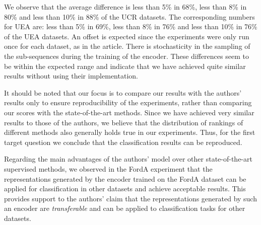 We observe that the average difference is less than 5\% in 68\%, less than 8\% in 80\% and less than 10\% in 88\% of the UCR datasets. The corresponding numbers for UEA are: less than 5\% in 69\%, less than 8\% in 76\% and less than 10\% in 76\% of the UEA datasets. An offset is expected since the experiments were only run once for each dataset, as in the article. There is stochasticity in the sampling of the sub-sequences during the training of the encoder.
These differences seem to be within the expected range and indicate that we have achieved quite similar results without using their implementation. 

It should be noted that our focus is to compare our results with the authors' results only to ensure reproducibility of the experiments, rather than comparing our scores with the state-of-the-art methods. Since we have achieved very similar results to those of the authors, we believe that the distribution of rankings of different methods also generally holds true in our experiments. Thus, for the first target question we conclude that the classification results can be reproduced.

Regarding the main advantages of the authors' model over other state-of-the-art supervised methods, we observed in the FordA experiment that the representations generated by the encoder trained on the FordA dataset can be applied for classification in other datasets and achieve acceptable results. This provides support to the authors' claim that the representations generated by such an encoder are %
\textit{transferable} and can be applied to classification tasks for other datasets.

